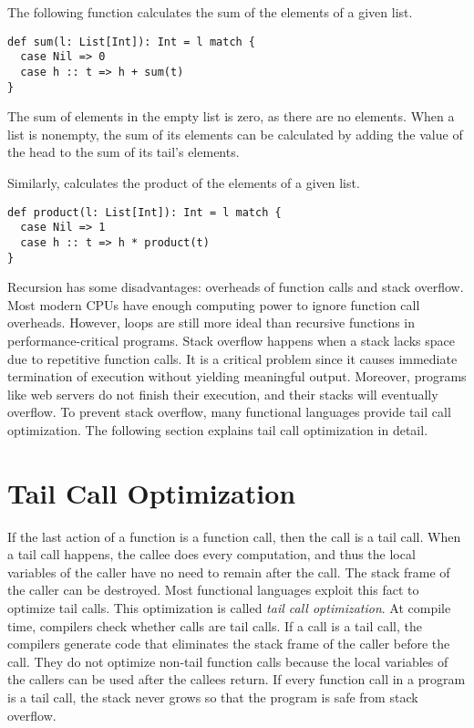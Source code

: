 The following function calculates the sum of the elements of a given list.

\begin{verbatim}
def sum(l: List[Int]): Int = l match {
  case Nil => 0
  case h :: t => h + sum(t)
}
\end{verbatim}

The sum of elements in the empty list is zero, as there are no elements.
When a list is nonempty, the sum of its elements can be calculated by adding the
value of the head to the sum of its tail's elements.

Similarly,  calculates the product of the elements of a given
list.

\begin{verbatim}
def product(l: List[Int]): Int = l match {
  case Nil => 1
  case h :: t => h * product(t)
}
\end{verbatim}

Recursion has some disadvantages: overheads of function calls and stack
overflow. Most modern CPUs have enough computing power to ignore function call
overheads. However, loops are still more ideal than recursive functions in
performance-critical programs. Stack overflow happens when a
stack lacks space due to repetitive function calls. It is a critical problem
since it causes immediate termination of execution without yielding meaningful
output. Moreover, programs like web servers do not finish their execution, and
their stacks will eventually overflow. To prevent stack overflow, many functional
languages provide tail call optimization.
The following section explains tail call optimization in detail.

\section{Tail Call Optimization}

If the last action of a function is a function call, then the call is a tail
call. When a tail call happens, the callee does every computation, and thus the
local variables of the caller have no need to remain after the call. The stack
frame of the caller can be destroyed. Most functional languages exploit this
fact to optimize tail calls. This optimization is called
\textit{tail call optimization}.
At compile time, compilers check whether calls are tail calls.
If a call is a tail call, the compilers generate code that eliminates the
stack frame of the caller before the call. They do not optimize non-tail function
calls because the local variables of the callers can be used after the callees
return. If every function call in a program is a tail call, the stack never
grows so that the program is safe from stack overflow.

